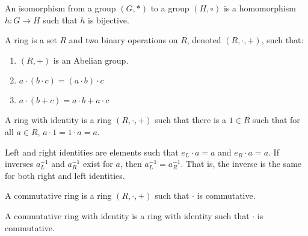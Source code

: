     \begin{definition}
        An isomorphism from a group $(G,*)$ to
        a group $(H,\circ)$ is a homomorphism
        $h:{G}\rightarrow{H}$ such that
        $h$ is bijective.
    \end{definition}
    \begin{definition}
        A ring is a set $R$ and two binary operations
        on $R$, denoted $(R,\cdot,+)$, such that:
        \begin{enumerate}
            \item $(R,+)$ is an Abelian group.
            \item $a\cdot({b}\cdot{c})=({a}\cdot{b})\cdot{c}$
            \item ${a}\cdot(b+c)={a}\cdot{b}+{a}\cdot{c}$
        \end{enumerate}
    \end{definition}
    \begin{definition}
        A ring with identity is a ring $(R,\cdot,+)$
        such that there is a ${1}\in{R}$ such that for
        all ${a}\in{R}$, ${a}\cdot{1}={1}\cdot{a}=a$.
    \end{definition}
    Left and right identities are elements such that ${e_{L}}\cdot{a}=a$
    and ${e_{R}}\cdot{a}=a$. If inverses $a_{L}^{-1}$ and $a_{R}^{-1}$
    exist for $a$, then $a_{L}^{-1}=a_{R}^{-1}$. That is, the inverse
    is the same for both right and left identities.
    \begin{definition}
        A commutative ring is a ring $(R,\cdot,+)$ such that
        $\cdot$ is commutative.
    \end{definition}
    \begin{definition}
        A commutative ring with identity is a ring with identity such
        that $\cdot$ is commutative.
    \end{definition}
